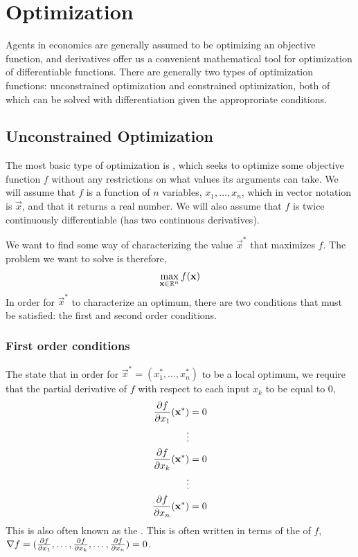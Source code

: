\section{Optimization}
Agents in economics are generally assumed to be optimizing an objective function, and derivatives offer us a convenient mathematical tool for optimization of differentiable functions. There are generally two types of optimization functions: unconstrained optimization and constrained optimization, both of which can be solved with differentiation given the approproriate conditions.

\subsection*{Unconstrained Optimization}
The most basic type of optimization is , which seeks to optimize some objective function $f$ without any restrictions on what values its arguments can take. We will assume that $f$ is a function of $n$ variables, $x_1, \dots, x_n$, which in vector notation is $\vec{x}$, and that it returns a real number. We will also assume that $f$ is twice continuously differentiable (has two continuous derivatives). 

We want to find some way of characterizing the value $\vec{x}^*$ that maximizes $f$. The problem we want to solve is therefore,
\begin{align*}
    \max_{\mathbf{x} \in \mathbb{R}^n} f(\mathbf{x})
\end{align*}
In order for $\vec{x}^*$ to characterize an optimum, there are two conditions that must be satisfied: the first and second order conditions. 

\subsubsection*{First order conditions}
The  state that in order for $\vec{x}^* = (x_1^*, \dots, x_n^*)$ to be a local optimum, we require that the partial derivative of $f$ with respect to each input $x_k$ to be equal to 0, 
\begin{align*}
    \frac{\partial f}{\partial x_1}(\mathbf{x}^*) &= 0 \\
    \vdots \\
    \frac{\partial f}{\partial x_k}(\mathbf{x}^*) &= 0 \\
    \vdots \\
    \frac{\partial f}{\partial x_n}(\mathbf{x}^*) &= 0
\end{align*}
This is also often known as the . This is often written in terms of the  of $f$, $\nabla f = (\frac{\partial f}{\partial x_1}, \dots, \frac{\partial f}{\partial x_k}, \dots, \frac{\partial f}{\partial x_n}) = 0$.

